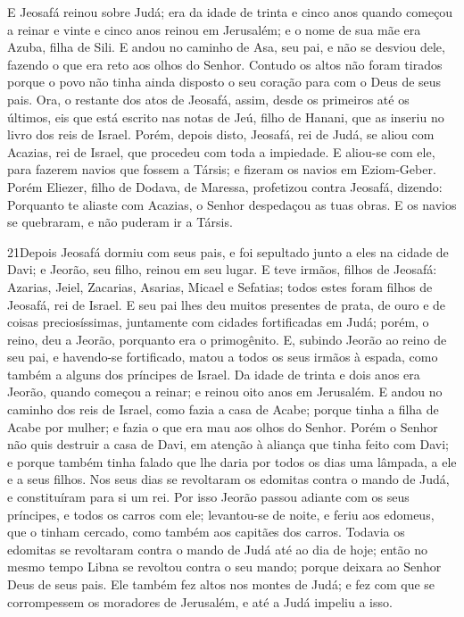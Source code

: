 E Jeosafá reinou sobre Judá; era da idade de trinta e cinco anos
quando começou a reinar e vinte e cinco anos reinou em Jerusalém; e
o nome de sua mãe era Azuba, filha de Sili. E andou no
caminho de Asa, seu pai, e não se desviou dele, fazendo o que era
reto aos olhos do Senhor. Contudo os altos não foram tirados
porque o povo não tinha ainda disposto o seu coração para com o Deus
de seus pais. Ora, o restante dos atos de Jeosafá, assim,
desde os primeiros até os últimos, eis que está escrito nas notas de
Jeú, filho de Hanani, que as inseriu no livro dos reis de Israel.
Porém, depois disto, Jeosafá, rei de Judá, se aliou com
Acazias, rei de Israel, que procedeu com toda a impiedade. E
aliou-se com ele, para fazerem navios que fossem a Társis; e fizeram
os navios em Eziom-Geber. Porém Eliezer, filho de Dodava, de
Maressa, profetizou contra Jeosafá, dizendo: Porquanto te aliaste
com Acazias, o Senhor despedaçou as tuas obras. E os navios se
quebraram, e não puderam ir a Társis.

\medskip

\lettrine{21} Depois Jeosafá dormiu com seus pais, e foi
sepultado junto a eles na cidade de Davi; e Jeorão, seu filho,
reinou em seu lugar. E teve irmãos, filhos de Jeosafá: Azarias,
Jeiel, Zacarias, Asarias, Micael e Sefatias; todos estes foram
filhos de Jeosafá, rei de Israel. E seu pai lhes deu muitos
presentes de prata, de ouro e de coisas preciosíssimas, juntamente
com cidades fortificadas em Judá; porém, o reino, deu a Jeorão,
porquanto era o primogênito. E, subindo Jeorão ao reino de seu
pai, e havendo-se fortificado, matou a todos os seus irmãos à
espada, como também a alguns dos príncipes de Israel. Da idade
de trinta e dois anos era Jeorão, quando começou a reinar; e reinou
oito anos em Jerusalém. E andou no caminho dos reis de Israel,
como fazia a casa de Acabe; porque tinha a filha de Acabe por
mulher; e fazia o que era mau aos olhos do Senhor. Porém o
Senhor não quis destruir a casa de Davi, em atenção à aliança que
tinha feito com Davi; e porque também tinha falado que lhe daria por
todos os dias uma lâmpada, a ele e a seus filhos. Nos seus dias
se revoltaram os edomitas contra o mando de Judá, e constituíram
para si um rei. Por isso Jeorão passou adiante com os seus
príncipes, e todos os carros com ele; levantou-se de noite, e feriu
aos edomeus, que o tinham cercado, como também aos capitães dos
carros. Todavia os edomitas se revoltaram contra o mando de
Judá até ao dia de hoje; então no mesmo tempo Libna se revoltou
contra o seu mando; porque deixara ao Senhor Deus de seus pais.
Ele também fez altos nos montes de Judá; e fez com que se
corrompessem os moradores de Jerusalém, e até a Judá impeliu a isso.

